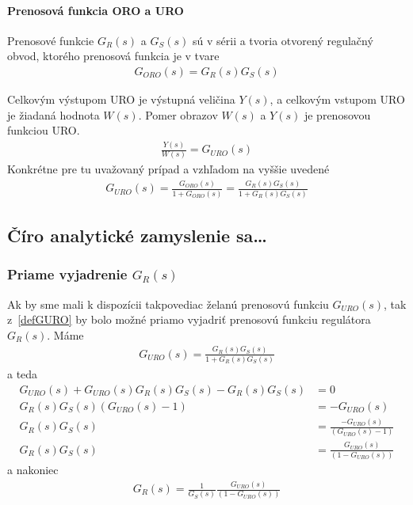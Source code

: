 \documentclass[a4paper, 10pt, ]{article}
\begin{document}
\paragraph{Prenosová funkcia ORO a URO}

Prenosové funkcie $G_R(s)$ a $G_S(s)$ sú v sérii a tvoria otvorený regulačný obvod, ktorého prenosová funkcia je v tvare
\begin{align}
    G_{ORO}(s) = G_R(s) G_S(s)
\end{align}

Celkovým výstupom URO je výstupná veličina $Y(s)$, a celkovým vstupom URO je žiadaná hodnota $W(s)$. Pomer obrazov $W(s)$ a $Y(s)$ je prenosovou funkciou URO.
\begin{align}
    \frac{Y(s)}{W(s)} = G_{URO}(s)
\end{align}
Konkrétne pre tu uvažovaný prípad a vzhľadom na vyššie uvedené
\begin{align} \label{defGURO}
    G_{URO}(s) = \frac{G_{ORO}(s)}{1+G_{ORO}(s)} = \frac{G_R(s) G_S(s)}{1 + G_R(s) G_S(s)}
\end{align}








\subsection{Číro analytické zamyslenie sa\ldots}
\label{Číro analytické zamyslenie sa}

\subsubsection{Priame vyjadrenie $G_R(s)$}

Ak by sme mali k dispozícii takpovediac želanú prenosovú funkciu $G_{URO}(s)$, tak z~\eqref{defGURO} by bolo možné priamo vyjadriť prenosovú funkciu regulátora $G_R(s)$. Máme
\begin{align} 
    G_{URO}(s)  = \frac{G_R(s) G_S(s)}{1 + G_R(s) G_S(s)}
\end{align}
a teda
\begin{align} 
    G_{URO}(s) + G_{URO}(s) G_R(s) G_S(s) - G_R(s) G_S(s) &= 0 \\
    G_R(s) G_S(s) \left( G_{URO}(s) - 1 \right) &= - G_{URO}(s) \\
    G_R(s) G_S(s) &= \frac{- G_{URO}(s)}{\left( G_{URO}(s) - 1 \right)} \\
    G_R(s) G_S(s) &= \frac{ G_{URO}(s)}{\left( 1 - G_{URO}(s) \right)} 
\end{align}
a nakoniec
\begin{align} 
    G_R(s)  = \frac{1}{G_S(s)} \frac{ G_{URO}(s)}{\left( 1 - G_{URO}(s) \right)} 
\end{align}
\end{document}

